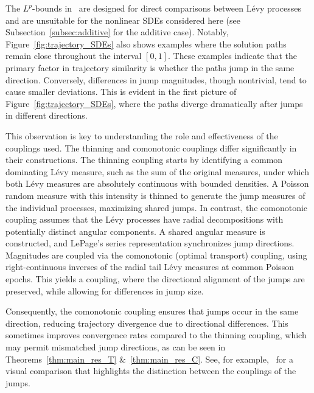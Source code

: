 \documentclass[en,oneside,bbfont,article]{amsart}
\theoremstyle{remark}
\theoremstyle{definition}
\theoremstyle{definition}
\newcommand\1{\mathds{1}}
\begin{document}
The $L^p$-bounds in~\cite{WassersteinPaper} are designed for direct comparisons between L\'evy processes and are unsuitable for the nonlinear SDEs considered here (see Subsection~\ref{subsec:additive} for the additive case). Notably, Figure~\ref{fig:trajectory_SDEs} also shows examples where the solution paths remain close throughout the interval $[0,1]$. These examples indicate that the primary factor in trajectory similarity is whether the paths jump in the same direction. Conversely, differences in jump magnitudes, though nontrivial, tend to cause smaller deviations. This is evident in the first picture of Figure~\ref{fig:trajectory_SDEs}, where the paths diverge dramatically after jumps in different directions.

This observation is key to understanding the role and effectiveness of the couplings used. The thinning and comonotonic couplings differ significantly in their constructions. The thinning coupling starts by identifying a common dominating L\'evy measure, such as the sum of the original measures, under which both L\'evy measures are absolutely continuous with bounded densities. A Poisson random measure with this intensity is thinned to generate the jump measures of the individual processes, maximizing shared jumps. In contrast, the comonotonic coupling assumes that the L\'evy processes have radial decompositions with potentially distinct angular components. A shared angular measure is constructed, and LePage's series representation synchronizes jump directions. Magnitudes are coupled via the comonotonic (optimal transport) coupling, using right-continuous inverses of the radial tail L\'evy measures at common Poisson epochs. This yields a coupling, where the directional alignment of the jumps are preserved, while allowing for differences in jump size.

Consequently, the comonotonic coupling ensures that jumps occur in the same direction, reducing trajectory divergence due to directional differences. This sometimes improves convergence rates compared to the thinning coupling, which may permit mismatched jump directions, as can be seen in Theorems~\ref{thm:main_res_T} \&~\ref{thm:main_res_C}. See, for example,~\cite[Fig.~1]{WassersteinPaper} for a visual comparison that highlights the distinction between the couplings of the jumps.
\end{document}
